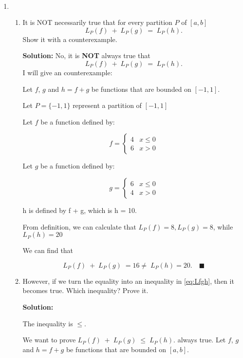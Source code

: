 \documentclass[12pt]{exam}
\begin{document}
\


\begin{enumerate}

\item  \begin{enumerate}
	\item It is NOT necessarily true that for every partition $P$ of $[a,b]$
		\begin{equation} \label{eq:Lfgh}
			L_{P}(f) \; + \; L_P(g) \; = \; L_P(h).
		\end{equation}
	Show it with a counterexample.
	
	\textbf{Solution:}
		No, it is \textbf{NOT} always true that
	$$
			L_{P}(f) \; + \; L_P(g) \; = \; L_P(h).
	$$
	I will give an counterexample:
	
	Let $f$, $g$ and $h=f+g$ be functions that are bounded on $[-1,1]$.
	
	Let $P=\{-1, 1\}$ represent a partition of $[-1,1]$
	
	Let $f$ be a function defined by:
	
	\[
	    f = 
	    \begin{cases}
	        4 & x \leq 0 \\
	        6 & x > 0
	    \end{cases}
	\]
	
	Let $g$ be a function defined by:
	
	\[
	    g = 
	    \begin{cases}
	        6 & x \leq 0 \\
	        4 & x > 0
	    \end{cases}
	\]
	
	h is defined by f + g, which is h = 10.
	
	From definition, we can calculate that $L_{P}(f) = 8, L_{P}(g) = 8$, while $L_{P}(h) = 20$
	
	We can find that 
	
	$$
	    L_{P}(f) \; + \; L_P(g) \; =  16 \neq \; L_P(h) = 20.\quad\blacksquare
	$$
	
	\newpage


	\item 	However, if we turn the equality into an inequality in \eqref{eq:Lfgh}, then it becomes true.  Which inequality?  Prove it.
	
	\textbf{Solution:}
	
	The inequality is $\leq$.
	
	We want to prove $L_{P}(f) \; + \; L_{P}(g) \; \leq \; L_{P}(h).$ always true. Let $f$, $g$ and $h=f+g$ be functions that are bounded on $[a,b]$.
	

\end{enumerate}
\end{enumerate}
\end{document}
